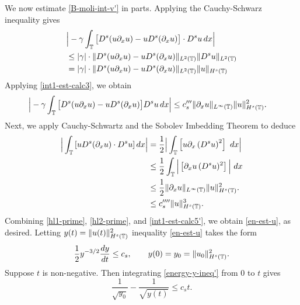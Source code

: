 %
%
%
We now estimate \eqref{B-moli-int-v'} in parts. Applying the Cauchy-Schwarz inequality gives
%
\begin{equation*} 
\begin{split}
& \Big|
- \gamma \int_{\mathbb{T}}
\big[ 
D^s(u\partial_x u)  -  u D^s (\partial_xu)
\big] \cdot
D^s u   \, dx
\Big|
\\
& \le
|\gamma| \cdot \|
D^s(u\partial_x u)  -  u D^s (\partial_xu)
\|_{L^2(\mathbb{T})}
\|
D^s u 
\|_{L^2(\mathbb{T})}
\\
& =
|\gamma| \cdot \| D^s(u\partial_x u)  -  u D^s (\partial_xu)
\|_{L^2(\mathbb{T})}
\|
u
\|_{H^s(\mathbb{T})}
\end{split}
\end{equation*}
Applying \eqref{int1-est-calc3}, we obtain
\begin{equation*}
\begin{split}
\Big|
- \gamma \int_{\mathbb{T}}
\big[ 
D^s(u\partial_x u)  -  u D^s (\partial_xu)
\big]
D^s u   \, dx
\Big|
&\le
c_s'''   \| \partial_x u \|_{L^\infty(\mathbb{T})} 
\| u \|_{H^s(\mathbb{T})}^2.
\end{split}
\end{equation*}
%
Next, we apply Cauchy-Schwartz and the Sobolev Imbedding Theorem to deduce 
%
%
%
\begin{equation} 
\label{int1-est-calc5'}
\begin{split}
\Big|
\int_{\mathbb{T}}
\left [u D^s (\partial_x u)
\cdot  D^s u \right ] dx
\Big|
& =
\frac{1}{2} \Big|
\int_{\mathbb{T}}
\left [u \partial_x\left(D^s u\right)^2 \right ] \ dx
\Big|
\\
& \le
\frac{1}{2} \int_{\mathbb{T}} \Big |
\left [\partial_x u \, (D^s u)^2  \right ] 
\Big| \ dx
\\
& \le
\frac{1}{2}
\| \partial_x u \|_{L^\infty(\mathbb{T})} 
\| u \|_{H^s(\mathbb{T})}^2.
\\
& \le c_s'''' \|u\|_{H^s(\mathbb{T})}^3.
\end{split}
\end{equation}
%
%
%
Combining \eqref{hl1-prime}, \eqref{hl2-prime},
and \eqref{int1-est-calc5'}, we obtain \eqref{en-est-u}, as desired.
Letting  $y(t)=  \|u(t)\|_{H^s(\mathbb{T})}^2$ inequality \eqref{en-est-u}
takes the form
%
\begin{equation} 
\label{energy-y-ineq'}
\frac 12
y^{-3/2}\frac{dy}{dt}
\le
c_s,
\qquad
y(0)=y_0=  \|u_0\|_{H^s(\mathbb{T})}^2.
\end{equation}
%
Suppose $t$ is non-negative. Then integrating  \eqref{energy-y-ineq'}
from  0 to $t$ gives
%
\begin{equation*} 
\frac{1}{\sqrt{y_0}}  - \frac{1}{\sqrt{y(t)}} 
\le 
c_s t.
\end{equation*}
